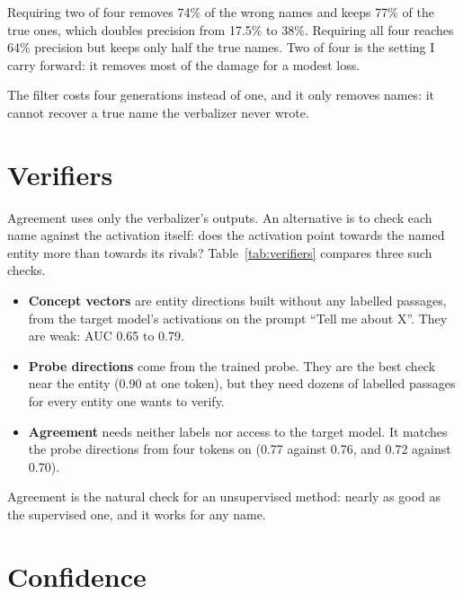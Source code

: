 Requiring two of four removes 74\% of the wrong names and keeps 77\% of the true ones, which doubles
precision from 17.5\% to 38\%. Requiring all four reaches 64\% precision but keeps only half the true names.
Two of four is the setting I carry forward: it removes most of the damage for a modest loss.

The filter costs four generations instead of one, and it only removes names: it cannot recover a true name
the verbalizer never wrote.

\section{Verifiers}

Agreement uses only the verbalizer's outputs. An alternative is to check each name against the activation
itself: does the activation point towards the named entity more than towards its rivals?
Table~\ref{tab:verifiers} compares three such checks.

\begin{table}[t]
\centering
\small

\caption[Three ways to tell true names from wrong ones]{Three ways to tell true names from wrong ones (AUC,
95\% intervals; natural text). The first two score a name by the activation's similarity to a direction for
that entity; they cover only names among the 60 listed entities, so the columns are not computed on
identical sets of names.}
\label{tab:verifiers}
\end{table}

\begin{itemize}
\item \textbf{Concept vectors} are entity directions built without any labelled passages, from the target
model's activations on the prompt ``Tell me about X''. They are weak: AUC 0.65 to 0.79.
\item \textbf{Probe directions} come from the trained probe. They are the best check near the entity (0.90
at one token), but they need dozens of labelled passages for every entity one wants to verify.
\item \textbf{Agreement} needs neither labels nor access to the target model. It matches the probe
directions from four tokens on (0.77 against 0.76, and 0.72 against 0.70).
\end{itemize}

Agreement is the natural check for an unsupervised method: nearly as good as the supervised one, and it
works for any name.

\section{Confidence}

